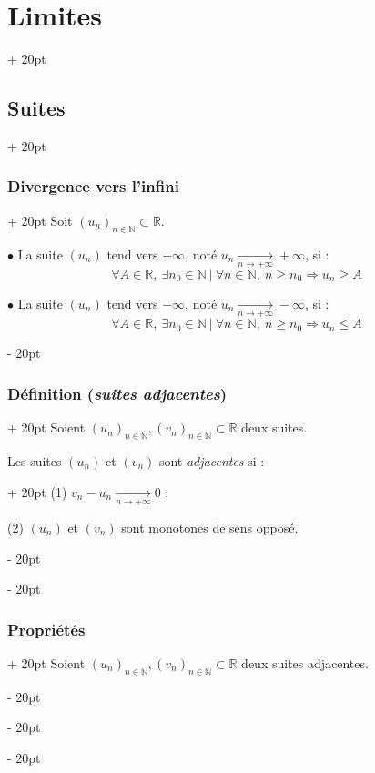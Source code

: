 \documentclass[a4paper, 12pt, twoside]{article}
\newcommand{\N}{\mathbb{N}} %
\newcommand{\R}{\mathbb{R}} %
\newcommand{\tendsto}[1]{\xrightarrow[#1]{}}
\renewcommand{\le}{\leqslant}
\renewcommand{\ge}{\geqslant}
\newcommand{\ind}[1][20pt]{\advance\leftskip + #1}
\newcommand{\deind}[1][20pt]{\advance\leftskip - #1}
\newenvironment{indt}[2][20pt]{#2 \par \ind[#1]}{\par \deind} %
\begin{document}
\begin{indt}{\section{Limites}}
\begin{indt}{\subsection{Suites}}
            \vspace{12pt}
            
            \begin{indt}{\subsubsection{Divergence vers l'infini}}
                Soit $(u_n)_{n \in \N} \subset \R$.

                $\bullet$ La suite $(u_n)$ tend vers $+\infty$, noté $u_n \tendsto{n \to +\infty} +\infty$, si :
                \[
                    \forall A \in \R,\ \exists n_0 \in \N\ |\ \forall n \in \N,\ n \ge n_0 \Rightarrow u_n \ge A
                \]

                $\bullet$ La suite $(u_n)$ tend vers $-\infty$, noté $u_n \tendsto{n \to +\infty} -\infty$, si :
                \[
                    \forall A \in \R,\ \exists n_0 \in \N\ |\ \forall n \in \N,\ n \ge n_0 \Rightarrow u_n \le A
                \]
            \end{indt}

            \vspace{12pt}
            
            \begin{indt}{\subsubsection{Définition (\textit{suites adjacentes})}}
                Soient $(u_n)_{n \in \N}, (v_n)_{n \in \N} \subset \R$ deux suites.

                \begin{indt}{Les suites $(u_n)$ et $(v_n)$ sont \textit{adjacentes} si :}
                    (1) $v_n - u_n \tendsto{n \to +\infty} 0$ ;

                    (2) $(u_n)$ et $(v_n)$ sont monotones de sens opposé.
                \end{indt}
            \end{indt}

            \vspace{12pt}
            
            \begin{indt}{\subsubsection{Propriétés}}
                Soient $(u_n)_{n \in \N}, (v_n)_{n \in \N} \subset \R$ deux suites adjacentes.


\end{indt}
\end{indt}
\end{indt}
\end{document}
